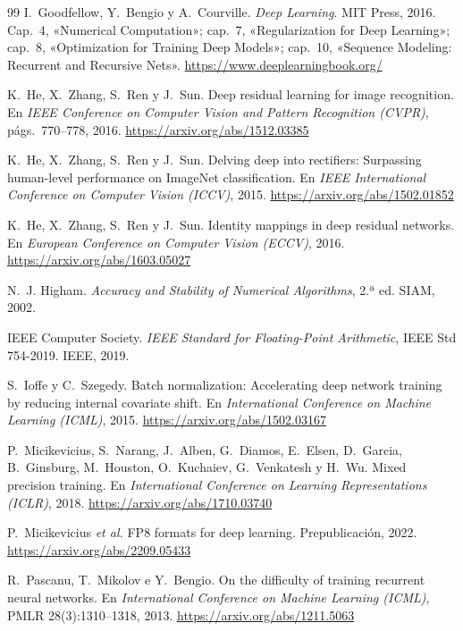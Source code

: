 \begin{thebibliography}{99}
I.~Goodfellow, Y.~Bengio y A.~Courville.
\newblock \emph{Deep Learning}.
\newblock MIT Press, 2016.
\newblock Cap.~4, «Numerical Computation»; cap.~7, «Regularization for Deep Learning»; cap.~8, «Optimization for Training Deep Models»; cap.~10, «Sequence Modeling: Recurrent and Recursive Nets».
\newblock \url{https://www.deeplearningbook.org/}

K.~He, X.~Zhang, S.~Ren y J.~Sun.
\newblock Deep residual learning for image recognition.
\newblock En \emph{IEEE Conference on Computer Vision and Pattern Recognition (CVPR)}, págs.~770--778, 2016.
\newblock \url{https://arxiv.org/abs/1512.03385}

K.~He, X.~Zhang, S.~Ren y J.~Sun.
\newblock Delving deep into rectifiers: Surpassing human-level performance on ImageNet classification.
\newblock En \emph{IEEE International Conference on Computer Vision (ICCV)}, 2015.
\newblock \url{https://arxiv.org/abs/1502.01852}

K.~He, X.~Zhang, S.~Ren y J.~Sun.
\newblock Identity mappings in deep residual networks.
\newblock En \emph{European Conference on Computer Vision (ECCV)}, 2016.
\newblock \url{https://arxiv.org/abs/1603.05027}

N.~J. Higham.
\newblock \emph{Accuracy and Stability of Numerical Algorithms}, 2.ª ed.
\newblock SIAM, 2002.

IEEE Computer Society.
\newblock \emph{IEEE Standard for Floating-Point Arithmetic}, IEEE Std 754-2019.
\newblock IEEE, 2019.

S.~Ioffe y C.~Szegedy.
\newblock Batch normalization: Accelerating deep network training by reducing internal covariate shift.
\newblock En \emph{International Conference on Machine Learning (ICML)}, 2015.
\newblock \url{https://arxiv.org/abs/1502.03167}

P.~Micikevicius, S.~Narang, J.~Alben, G.~Diamos, E.~Elsen, D.~Garcia, B.~Ginsburg, M.~Houston, O.~Kuchaiev, G.~Venkatesh y H.~Wu.
\newblock Mixed precision training.
\newblock En \emph{International Conference on Learning Representations (ICLR)}, 2018.
\newblock \url{https://arxiv.org/abs/1710.03740}

P.~Micikevicius \emph{et al.}
\newblock FP8 formats for deep learning.
\newblock Prepublicación, 2022.
\newblock \url{https://arxiv.org/abs/2209.05433}

R.~Pascanu, T.~Mikolov e Y.~Bengio.
\newblock On the difficulty of training recurrent neural networks.
\newblock En \emph{International Conference on Machine Learning (ICML)}, PMLR 28(3):1310--1318, 2013.
\newblock \url{https://arxiv.org/abs/1211.5063}


\end{thebibliography}

